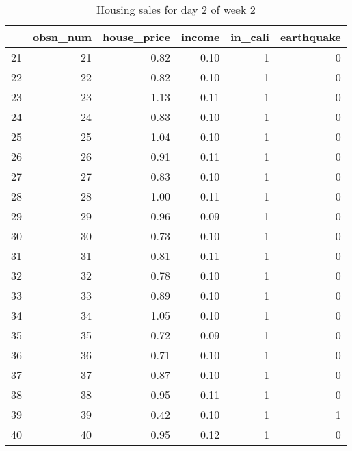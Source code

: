 \begin{table}[ht]
\centering
\begin{tabular}{rrrrrr}
  \hline
 & obsn\_num & house\_price & income & in\_cali & earthquake \\ 
  \hline
21 &  21 & 0.82 & 0.10 &   1 &   0 \\ 
  22 &  22 & 0.82 & 0.10 &   1 &   0 \\ 
  23 &  23 & 1.13 & 0.11 &   1 &   0 \\ 
  24 &  24 & 0.83 & 0.10 &   1 &   0 \\ 
  25 &  25 & 1.04 & 0.10 &   1 &   0 \\ 
  26 &  26 & 0.91 & 0.11 &   1 &   0 \\ 
  27 &  27 & 0.83 & 0.10 &   1 &   0 \\ 
  28 &  28 & 1.00 & 0.11 &   1 &   0 \\ 
  29 &  29 & 0.96 & 0.09 &   1 &   0 \\ 
  30 &  30 & 0.73 & 0.10 &   1 &   0 \\ 
  31 &  31 & 0.81 & 0.11 &   1 &   0 \\ 
  32 &  32 & 0.78 & 0.10 &   1 &   0 \\ 
  33 &  33 & 0.89 & 0.10 &   1 &   0 \\ 
  34 &  34 & 1.05 & 0.10 &   1 &   0 \\ 
  35 &  35 & 0.72 & 0.09 &   1 &   0 \\ 
  36 &  36 & 0.71 & 0.10 &   1 &   0 \\ 
  37 &  37 & 0.87 & 0.10 &   1 &   0 \\ 
  38 &  38 & 0.95 & 0.11 &   1 &   0 \\ 
  39 &  39 & 0.42 & 0.10 &   1 &   1 \\ 
  40 &  40 & 0.95 & 0.12 &   1 &   0 \\ 
   \hline
\end{tabular}
\caption{Housing sales for day 2 of week 2} 
\end{table}
